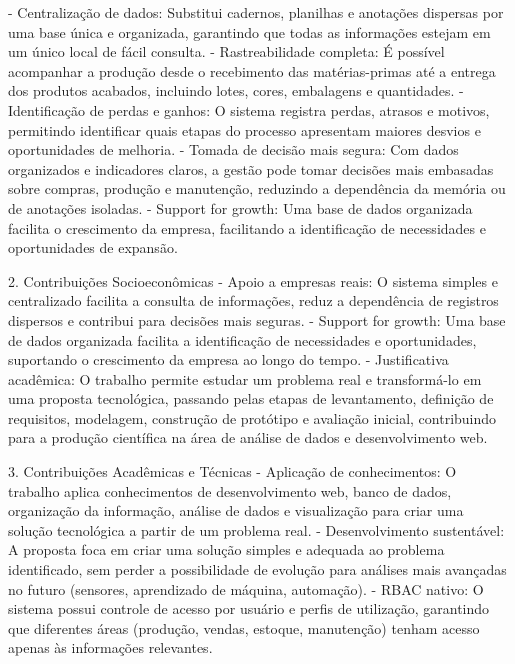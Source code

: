 \documentclass[12pt,a4paper]{article}
\begin{document}
- Centralização de dados: Substitui cadernos, planilhas e anotações dispersas por uma base única e organizada, garantindo que todas as informações estejam em um único local de fácil consulta.
- Rastreabilidade completa: É possível acompanhar a produção desde o recebimento das matérias-primas até a entrega dos produtos acabados, incluindo lotes, cores, embalagens e quantidades.
- Identificação de perdas e ganhos: O sistema registra perdas, atrasos e motivos, permitindo identificar quais etapas do processo apresentam maiores desvios e oportunidades de melhoria.
- Tomada de decisão mais segura: Com dados organizados e indicadores claros, a gestão pode tomar decisões mais embasadas sobre compras, produção e manutenção, reduzindo a dependência da memória ou de anotações isoladas.
- Support for growth: Uma base de dados organizada facilita o crescimento da empresa, facilitando a identificação de necessidades e oportunidades de expansão.

2. Contribuições Socioeconômicas
- Apoio a empresas reais: O sistema simples e centralizado facilita a consulta de informações, reduz a dependência de registros dispersos e contribui para decisões mais seguras.
- Support for growth: Uma base de dados organizada facilita a identificação de necessidades e oportunidades, suportando o crescimento da empresa ao longo do tempo.
- Justificativa acadêmica: O trabalho permite estudar um problema real e transformá-lo em uma proposta tecnológica, passando pelas etapas de levantamento, definição de requisitos, modelagem, construção de protótipo e avaliação inicial, contribuindo para a produção científica na área de análise de dados e desenvolvimento web.

3. Contribuições Acadêmicas e Técnicas
- Aplicação de conhecimentos: O trabalho aplica conhecimentos de desenvolvimento web, banco de dados, organização da informação, análise de dados e visualização para criar uma solução tecnológica a partir de um problema real.
- Desenvolvimento sustentável: A proposta foca em criar uma solução simples e adequada ao problema identificado, sem perder a possibilidade de evolução para análises mais avançadas no futuro (sensores, aprendizado de máquina, automação).
- RBAC nativo: O sistema possui controle de acesso por usuário e perfis de utilização, garantindo que diferentes áreas (produção, vendas, estoque, manutenção) tenham acesso apenas às informações relevantes.
\end{document}
